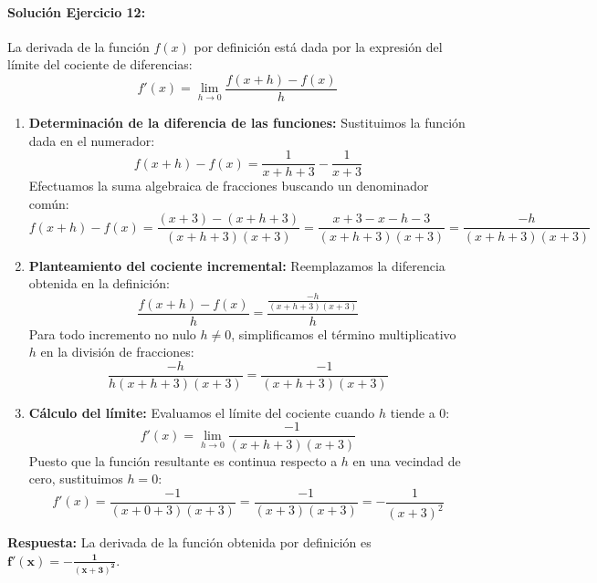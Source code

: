 \documentclass[11pt,letterpaper]{article}
\begin{document}
\paragraph{Solución Ejercicio 12:}
La derivada de la función $f(x)$ por definición está dada por la expresión del límite del cociente de diferencias:
$$f'(x) = \lim_{h\to 0} \frac{f(x+h) - f(x)}{h}$$
\begin{enumerate}
    \item \textbf{Determinación de la diferencia de las funciones:} Sustituimos la función dada en el numerador:
    $$f(x+h) - f(x) = \frac{1}{x+h+3} - \frac{1}{x+3}$$
    Efectuamos la suma algebraica de fracciones buscando un denominador común:
    $$f(x+h) - f(x) = \frac{(x+3) - (x+h+3)}{(x+h+3)(x+3)} = \frac{x + 3 - x - h - 3}{(x+h+3)(x+3)} = \frac{-h}{(x+h+3)(x+3)}$$
    
    \item \textbf{Planteamiento del cociente incremental:} Reemplazamos la diferencia obtenida en la definición:
    $$\frac{f(x+h) - f(x)}{h} = \frac{\frac{-h}{(x+h+3)(x+3)}}{h}$$
    Para todo incremento no nulo $h \neq 0$, simplificamos el término multiplicativo $h$ en la división de fracciones:
    $$\frac{-h}{h(x+h+3)(x+3)} = \frac{-1}{(x+h+3)(x+3)}$$
    
    \item \textbf{Cálculo del límite:} Evaluamos el límite del cociente cuando $h$ tiende a $0$:
    $$f'(x) = \lim_{h\to 0} \frac{-1}{(x+h+3)(x+3)}$$
    Puesto que la función resultante es continua respecto a $h$ en una vecindad de cero, sustituimos $h = 0$:
    $$f'(x) = \frac{-1}{(x + 0 + 3)(x + 3)} = \frac{-1}{(x+3)(x+3)} = -\frac{1}{(x+3)^2}$$
\end{enumerate}
\textbf{Respuesta:} La derivada de la función obtenida por definición es $\mathbf{f'(x) = -\frac{1}{(x+3)^2}}$.
\end{document}
